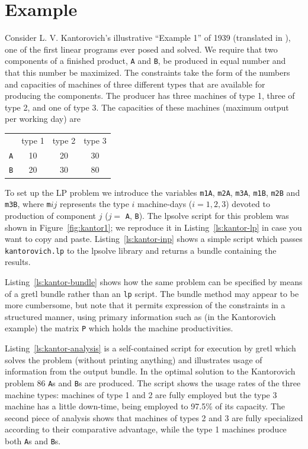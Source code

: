 \documentclass{article}
\begin{document}
\section{Example}
\label{sec:example}

Consider L. V. Kantorovich's illustrative ``Example 1'' of 1939
(translated in \cite{kantorovich60}), one of the first linear programs
ever posed and solved. We require that two components of a finished
product, \texttt{A} and \texttt{B}, be produced in equal number and
that this number be maximized. The constraints take the form of the
numbers and capacities of machines of three different types that are
available for producing the components. The producer has three
machines of type 1, three of type 2, and one of type 3. The capacities
of these machines (maximum output per working day) are

\begin{center}
\begin{tabular}{cccc}
  & type 1 & type 2 & type 3 \\
  \texttt{A} & 10 & 20 & 30 \\
  \texttt{B} & 20 & 30 & 80 
\end{tabular}
\end{center}

To set up the LP problem we introduce the variables \texttt{m1A},
\texttt{m2A}, \texttt{m3A}, \texttt{m1B}, \texttt{m2B} and
\texttt{m3B}, where \texttt{m}$ij$ represents the type $i$
machine-days ($i=1,2,3$) devoted to production of component $j$ ($j=$
\texttt{A}, \texttt{B}).  The \textsf{lpsolve} script for this problem
was shown in Figure~\ref{fig:kantor1}; we reproduce it in
Listing~\ref{ls:kantor-lp} in case you want to copy and
paste. Listing~\ref{ls:kantor-inp} shows a simple script which passes
\texttt{kantorovich.lp} to the \textsf{lpsolve} library and returns a
bundle containing the results.

Listing~\ref{ls:kantor-bundle} shows how the same problem can be
specified by means of a gretl bundle rather than an \texttt{lp}
script. The bundle method may appear to be more cumbersome, but note
that it permits expression of the constraints in a structured manner,
using primary information such as (in the Kantorovich example) the
matrix \texttt{P} which holds the machine productivities.

Listing~\ref{ls:kantor-analysis} is a self-contained script for
execution by gretl which solves the problem (without printing
anything) and illustrates usage of information from the output
bundle. In the optimal solution to the Kantorovich problem 86
\texttt{A}s and \texttt{B}s are produced. The script shows the usage
rates of the three machine types: machines of type 1 and 2 are fully
employed but the type 3 machine has a little down-time, being employed
to 97.5\% of its capacity. The second piece of analysis shows that
machines of types 2 and 3 are fully specialized according to their
comparative advantage, while the type 1 machines produce both
\texttt{A}s and \texttt{B}s.
\end{document}
